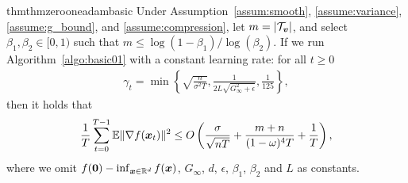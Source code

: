 \begin{restatable}{thm}{thmzerooneadambasic}
\label{thm:basic01}
Under Assumption~\ref{assum:smooth}, \ref{assume:variance}, \ref{assume:g_bound}, and \ref{assume:compression}, let $m=|\mathcal{T}_{\boldsymbol{v}}|$, and select $\beta_1, \beta_2\in[0,1)$ such that $m\leq\log(1-\beta_1)/\log(\beta_2)$.
If we run Algorithm~\ref{algo:basic01} with a constant learning rate: for all $t\geq 0$
\begin{align*}
    \gamma_t = \min\left\{ \sqrt{\frac{n}{\sigma^2T}}, \frac{1}{2L\sqrt{G_\infty^2+\epsilon}}, \frac{1}{125}  \right\},
\end{align*}
then it holds that
\begin{align*}
    \frac{1}{T}\sum_{t=0}^{T-1} \mathbb{E}\|\nabla f(\boldsymbol{x}_t)\|^2 \leq O\left( \frac{\sigma}{\sqrt{nT}} + \frac{m+n}{(1-\omega)^4T} +\frac{1}{T}\right),
\end{align*}
where we omit $f(\boldsymbol{0})-\inf_{\boldsymbol{x}\in\mathbb{R}^d}f(\boldsymbol{x})$,  $G_\infty$, $d$, $\epsilon$, $\beta_1$, $\beta_2$ and $L$ as constants.
\end{restatable}

